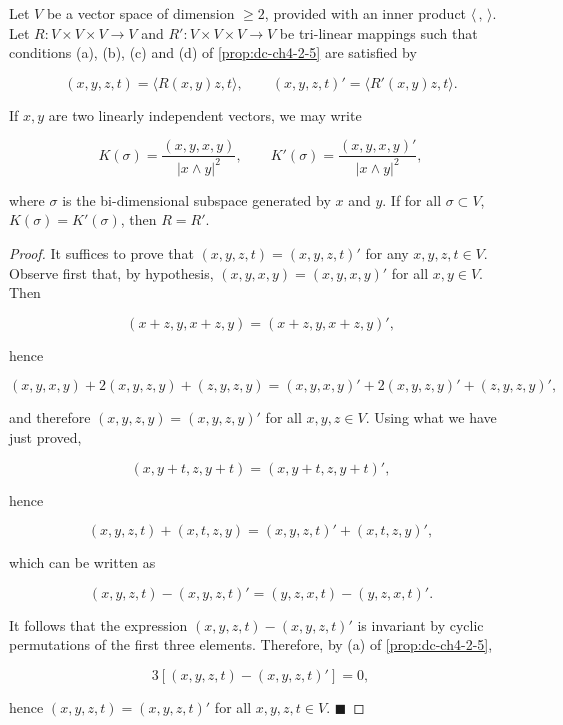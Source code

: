 \begin{lemma}
  \label{lem:dc-ch4-3-3}
  \leanok
  Let $V$ be a vector space of dimension $\geq 2$, provided with an inner product
  $\langle\,,\,\rangle$. Let $R:V\times V\times V\to V$ and $R':V\times V\times V\to V$
  be tri-linear mappings such that conditions (a), (b), (c) and (d) of \cref{prop:dc-ch4-2-5} are satisfied by
  
  $$
  (x,y,z,t)=\langle R(x,y)z,t\rangle,\qquad (x,y,z,t)'=\langle R'(x,y)z,t\rangle.
  $$
  
  If $x,y$ are two linearly independent vectors, we may write
  
  $$
  K(\sigma)=\frac{(x,y,x,y)}{|x\wedge y|^2},\qquad K'(\sigma)=\frac{(x,y,x,y)'}{|x\wedge y|^2},
  $$
  
  where $\sigma$ is the bi-dimensional subspace generated by $x$ and $y$. If for all
  $\sigma\subset V$, $K(\sigma)=K'(\sigma)$, then $R=R'$.
\end{lemma}
\begin{proof}
  \leanok
  \sketch
  It suffices to prove that $(x,y,z,t)=(x,y,z,t)'$ for any $x,y,z,t\in V$.
  Observe first that, by hypothesis, $(x,y,x,y)=(x,y,x,y)'$ for all $x,y\in V$. Then
  
  $$
  (x+z,y,x+z,y)=(x+z,y,x+z,y)',
  $$
  
  hence
  
  $$
  (x,y,x,y)+2(x,y,z,y)+(z,y,z,y)=(x,y,x,y)'+2(x,y,z,y)'+(z,y,z,y)',
  $$
  
  and therefore $(x,y,z,y)=(x,y,z,y)'$ for all $x,y,z\in V$. Using what we have just
  proved,
  
  $$
  (x,y+t,z,y+t)=(x,y+t,z,y+t)',
  $$
  
  hence
  
  $$
  (x,y,z,t)+(x,t,z,y)=(x,y,z,t)'+(x,t,z,y)',
  $$
  
  which can be written as
  
  $$
  (x,y,z,t)-(x,y,z,t)'=(y,z,x,t)-(y,z,x,t)'.
  $$
  
  It follows that the expression $(x,y,z,t)-(x,y,z,t)'$ is invariant by cyclic
  permutations of the first three elements. Therefore, by (a) of \cref{prop:dc-ch4-2-5},
  
  $$
  3[(x,y,z,t)-(x,y,z,t)']=0,
  $$
  
  hence $(x,y,z,t)=(x,y,z,t)'$ for all $x,y,z,t\in V$. $\blacksquare$
\end{proof}

